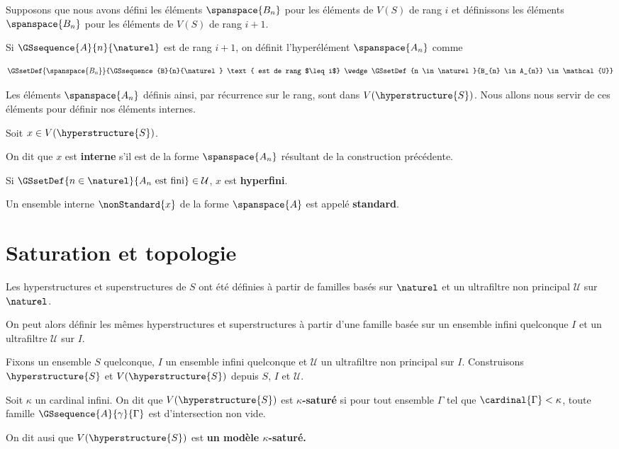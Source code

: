 \documentclass[a4paper, 12pt]{report}
\begin{document}
Supposons que nous avons défini les éléments $\spanspace{B_{n}}$ pour les
éléments de $V(S)$ de rang $i$ et définissons les éléments $\spanspace{B_{n}}$
pour les éléments de $V(S)$ de rang $i + 1$.

Si $\GSsequence{A}{n}{\naturel}$ est de rang $i + 1$, on définit l'hyperélément
$\spanspace{A_{n}}$ comme

\begin{equation}
	\GSsetDef{\spanspace{B_{n}}}{\GSsequence{B}{n}{\naturel} \text{ est de rang $\leq i$}
		\wedge \GSsetDef{n \in \naturel}{B_{n} \in A_{n}} \in \mathcal{U}}
\end{equation}

Les éléments $\spanspace{A_{n}}$ définis ainsi, par récurrence sur le rang, sont
dans $V(\hyperstructure{S})$. Nous allons nous servir de ces éléments pour
définir nos éléments internes.

\begin{definition}
	Soit $x \in V(\hyperstructure{S})$.

	On dit que $x$ est \textbf{interne} s'il est de la forme $\spanspace{A_{n}}$
	résultant de la construction précédente.

	Si $\GSsetDef{n \in \naturel}{A_{n} \text{ est fini}} \in \mathcal{U}$, $x$
	est \textbf{hyperfini}.

	Un ensemble interne $\nonStandard{x}$ de la forme $\spanspace{A}$ est appelé
	\textbf{standard}.
\end{definition}

\chapter{Saturation et topologie}

Les hyperstructures et superstructures de $S$ ont été définies à partir de
familles basés sur $\naturel$ et un ultrafiltre non principal $\mathcal{U}$ sur
$\naturel$.

On peut alors définir les mêmes hyperstructures et superstructures à partir
d'une famille basée sur un ensemble infini quelconque $I$ et un ultrafiltre
$\mathcal{U}$ sur $I$.

Fixons un ensemble $S$ quelconque, $I$ un ensemble infini quelconque et
$\mathcal{U}$ un ultrafiltre non principal sur $I$. Construisons
$\hyperstructure{S}$ et $V(\hyperstructure{S})$ depuis $S$, $I$ et
$\mathcal{U}$.

\begin{definition}
	Soit $\kappa$ un cardinal infini.
	On dit que $V(\hyperstructure{S})$ est \textbf{$\kappa$-saturé} si pour tout
	ensemble $\Gamma$ tel que $\cardinal{\Gamma} < \kappa$, toute famille
	$\GSsequence{A}{\gamma}{\Gamma}$ est d'intersection non vide.

	On dit ausi que $V(\hyperstructure{S})$ est \textbf{un modèle
	$\kappa$-saturé.}
\end{definition}
\end{document}
